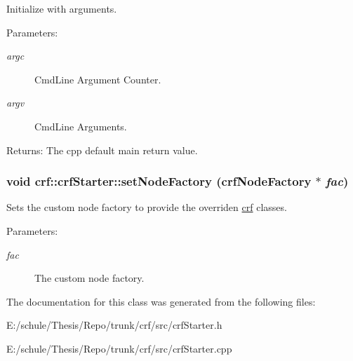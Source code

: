 Initialize with arguments. 

\begin{Desc}
\item[Parameters:]
\begin{description}
\item[{\em argc}]CmdLine Argument Counter. \item[{\em argv}]CmdLine Arguments. \end{description}
\end{Desc}
\begin{Desc}
\item[Returns:]The cpp default main return value. \end{Desc}
\hypertarget{a00007_317832b54784e7c2c21f5d6bda17cda3}{
\subsubsection[{setNodeFactory}]{\setlength{\rightskip}{0pt plus 5cm}void crf::crfStarter::setNodeFactory ({\bf crfNodeFactory} $\ast$ {\em fac})}}
\label{a00007_317832b54784e7c2c21f5d6bda17cda3}


Sets the custom node factory to provide the overriden \hyperlink{a00043}{crf} classes. 

\begin{Desc}
\item[Parameters:]
\begin{description}
\item[{\em fac}]The custom node factory. \end{description}
\end{Desc}


The documentation for this class was generated from the following files:\begin{CompactItemize}
\item 
E:/schule/Thesis/Repo/trunk/crf/src/crfStarter.h\item 
E:/schule/Thesis/Repo/trunk/crf/src/crfStarter.cpp\end{CompactItemize}
